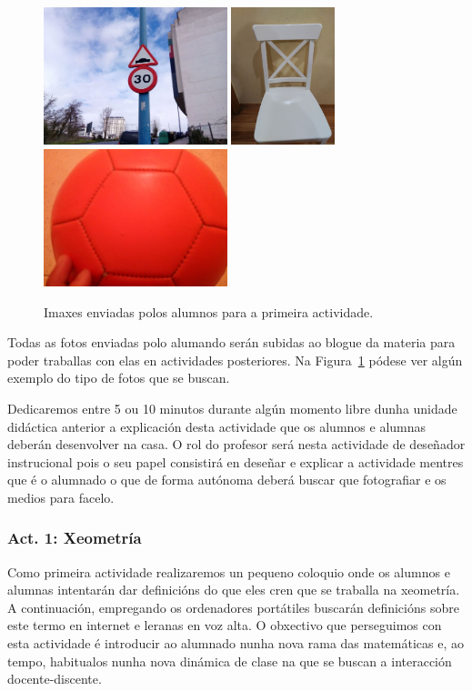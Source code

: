 \begin{figure}[h!]
  \centering
  \includegraphics[height=4cm]{img/act0-1.jpg}
  \includegraphics[height=4cm]{img/act0-2.jpg}
  \includegraphics[height=4cm]{img/act0-3.jpg}
  \caption{Imaxes enviadas polos alumnos para a primeira actividade.}\label{fig:act0}
\end{figure}

Todas as fotos enviadas polo alumando serán subidas ao blogue da materia para poder traballas con elas en actividades posteriores. Na Figura~\ref{fig:act0} pódese ver algún exemplo do tipo de fotos que se buscan.

Dedicaremos entre 5 ou 10 minutos durante algún momento libre dunha unidade didáctica anterior a explicación desta actividade que os alumnos e alumnas deberán desenvolver na casa. O rol do profesor será nesta actividade de deseñador instrucional pois o seu papel consistirá en deseñar e explicar a actividade mentres que é o alumnado o que de forma autónoma deberá buscar que fotografiar e os medios para facelo.

\subsubsection{Act. 1: Xeometría}\label{act:xeometria}
Como primeira actividade realizaremos un pequeno coloquio onde os alumnos e alumnas intentarán dar definicións do que eles cren que se traballa na xeometría. A continuación, empregando os ordenadores portátiles buscarán definicións sobre este termo en internet e leranas en voz alta. O obxectivo que perseguimos con esta actividade é introducir ao alumnado nunha nova rama das matemáticas e, ao tempo, habitualos nunha nova dinámica de clase na que se buscan a interacción docente-discente.

